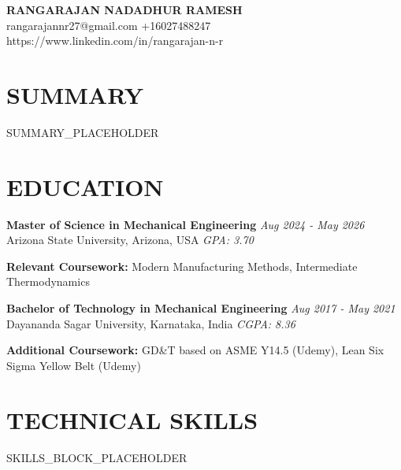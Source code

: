 \documentclass[a4paper,10pt]{extarticle}
\begin{document}
\begin{center}
  {\large \textbf{RANGARAJAN NADADHUR RAMESH}} \\[2pt]
  {\small rangarajannr27@gmail.com \textbar{} +16027488247 \textbar{} https://www.linkedin.com/in/rangarajan-n-r}
\end{center}

\vspace{2pt}

\section{SUMMARY}

SUMMARY\_PLACEHOLDER

\section{EDUCATION}

\noindent \textbf{Master of Science in Mechanical Engineering} \hfill \textit{Aug 2024 - May 2026} \\
Arizona State University, Arizona, USA \hfill \textit{GPA: 3.70}

\vspace{2pt}
\noindent \textbf{Relevant Coursework:} Modern Manufacturing Methods, Intermediate Thermodynamics

\vspace{4pt}

\noindent \textbf{Bachelor of Technology in Mechanical Engineering} \hfill \textit{Aug 2017 - May 2021} \\
Dayananda Sagar University, Karnataka, India \hfill \textit{CGPA: 8.36}

\vspace{2pt}
\noindent \textbf{Additional Coursework:} GD\&T based on ASME Y14.5 (Udemy), Lean Six Sigma Yellow Belt (Udemy)

\section{TECHNICAL SKILLS}

\begin{itemize}[leftmargin=0.15in, itemsep=0pt, parsep=0pt, topsep=2pt]
  SKILLS\_BLOCK\_PLACEHOLDER
\end{itemize}

\end{document}
